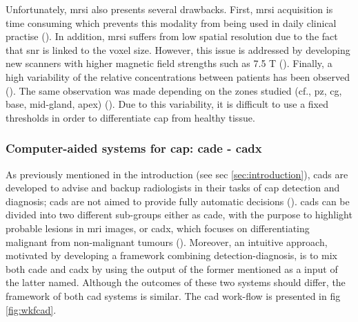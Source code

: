 \begin{enumerate}[leftmargin=*]
Unfortunately, \ac{mrsi} also presents several drawbacks. First, \ac{mrsi} acquisition is time consuming which prevents this modality from being used in daily clinical practise (\cite{Barentsz2012}). In addition, \ac{mrsi} suffers from low spatial resolution due to the fact that \ac{snr} is linked to the voxel size. However, this issue is addressed by developing new scanners with higher magnetic field strengths such as 7.5 T (\cite{Giskeodegard2013}). Finally, a high variability of the relative concentrations between patients has been observed (\cite{Choi2007}). The same observation was made depending on the zones studied (cf., \ac{pz}, \ac{cg}, base, mid-gland, apex) (\cite{Walker2010,Lemaitre2011}). Due to this variability, it is difficult to use a fixed thresholds in order to differentiate \ac{cap} from healthy tissue.

\end{enumerate}

\subsubsection{Computer-aided systems for \ac{cap}: \ac{cade} - \ac{cadx}} \label{subsubsec:CAD}

As previously mentioned in the introduction (see \acs{sec} \ref{sec:introduction}), \acp{cad} are developed to advise and backup radiologists in their tasks of \ac{cap} detection and diagnosis; \acp{cad} are not aimed to provide fully automatic decisions (\cite{Giger2008}). \acp{cad} can be divided into two different sub-groups either as \ac{cade}, with the purpose to highlight probable lesions in \ac{mri} images, or \ac{cadx}, which focuses on differentiating malignant from non-malignant tumours (\cite{Giger2008}). Moreover, an intuitive approach, motivated by developing a framework combining detection-diagnosis, is to mix both \ac{cade} and \ac{cadx} by using the output of the former mentioned as a input of the latter named. Although the outcomes of these two systems should differ, the framework of both \ac{cad} systems is similar. The \ac{cad} work-flow is presented in \acs{fig} \ref{fig:wkfcad}.

